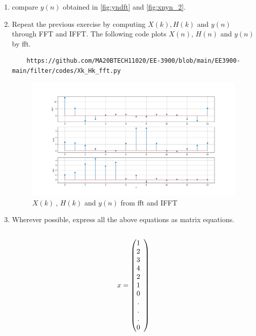 \documentclass[journal,12pt,twocolumn]{IEEEtran}
\renewcommand\thesection{\arabic{section}}
\begin{document}
\begin{enumerate}[label=\thesection.\arabic*]
\item compare $y(n)$ obtained in \ref{fig:yndft} and \ref{fig:xnyn_2}.\\
\solution 



\item Repeat the previous exercise by computing $X(k), H(k)$ and $y(n)$ through FFT and 
IFFT.
\solution The following code plots $X(n)$, $H(n)$ and $y(n)$ by fft.
\begin{lstlisting}
    https://github.com/MA20BTECH11020/EE-3900/blob/main/EE3900-main/filter/codes/Xk_Hk_fft.py
\end{lstlisting}

\begin{figure}[!ht]
\centering
\includegraphics[width=\columnwidth]{./figs/Xk-Hk-Yn_fft.png}
\caption{$X(k)~$, $H(k)$ and $y(n)$ from fft and IFFT}
\label{fig:Xk_Hk_yn}
\end{figure}

\item Wherever possible, express all the above equations as matrix equations.\\
\solution \\
\[
\begin{array}{lc}
    x = 
  \left(\begin{array}{@{}ccc@{}}
    1 \\
    2 \\
    3 \\
    4 \\
    2 \\
    1 \\
    0 \\
    . \\
    . \\
    . \\
    0 \\
  \end{array}\right) \\[15pt]
\end{array}
\]


\end{enumerate}
\end{document}
